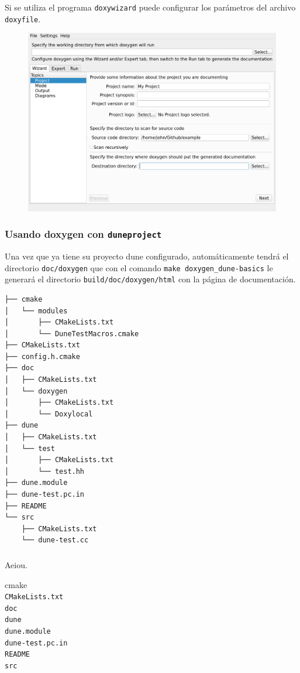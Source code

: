 \begin{frame}
	Si se utiliza el programa \lstinline{doxywizard} puede configurar los parámetros del archivo \lstinline{doxyfile}.

	\begin{figure}[ht!]
		\centering
		\includegraphics[scale=0.2]{wizard_capture.png}
	\end{figure}
\end{frame}

\begin{frame}[fragile]
	\frametitle{Usando doxygen con \lstinline{duneproject}}
	Una vez que ya tiene su proyecto dune configurado, automáticamente tendrá el directorio \lstinline{doc/doxygen} que con el comando \lstinline{make doxygen_dune-basics} le generará el directorio \lstinline{build/doc/doxygen/html} con la página de documentación.
	\begin{verbatim}
├── cmake
│   └── modules
│       ├── CMakeLists.txt
│       └── DuneTestMacros.cmake
├── CMakeLists.txt
├── config.h.cmake
├── doc
│   ├── CMakeLists.txt
│   └── doxygen
│       ├── CMakeLists.txt
│       └── Doxylocal
├── dune
│   ├── CMakeLists.txt
│   └── test
│       ├── CMakeLists.txt
│       └── test.hh
├── dune.module
├── dune-test.pc.in
├── README
└── src
    ├── CMakeLists.txt
    └── dune-test.cc
\end{verbatim}
\end{frame}

\begin{frame}[fragile]
	\frametitle{}
	Aeiou.
	\begin{description}
		\item[cmake]%
		\item[\lstinline{CMakeLists.txt}]
		\item[\lstinline{doc}]
		\item[\lstinline{dune}]
		\item[\lstinline{dune.module}]
		\item[\lstinline{dune-test.pc.in}]
		\item[\lstinline{README}]
		\item[\lstinline{src}]
	\end{description}
\end{frame}

